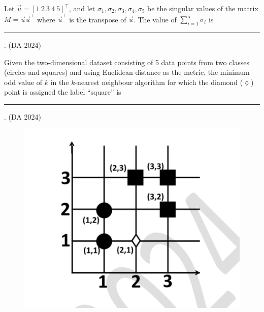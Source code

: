 \item Let $\vec{u} = [1\ 2\ 3\ 4\ 5]^{\top}$, and let $\sigma_1, \sigma_2, \sigma_3, \sigma_4, \sigma_5$ be the singular values of the matrix $M = \vec{u} \vec{u}^{\top}$ where $\vec{u}^{\top}$ is the transpose of $\vec{u}$. The value of $\sum\limits_{i=1}^{5} \sigma_i$ is \rule{1cm}{0.01pt}.
	\hfill (DA 2024)
\item Given the two-dimensional dataset consisting of 5 data points from two classes (circles and squares) 
and using Euclidean distance as the metric, the minimum odd value of $k$ in the $k$-nearest neighbour algorithm  
for which the diamond ($\lozenge$) point is assigned the label ``square'' is \rule{1cm}{0.01pt}.
	\hfill (DA 2024)
\begin{figure}[H]
\centering
\includegraphics[width=0.45\columnwidth]{GATE/2024/DA/figs/63.png} %
\label{fig:63}
\end{figure}

